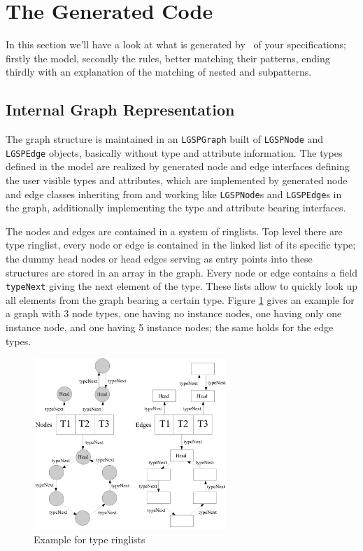 \section{The Generated Code}
In this section we'll have a look at what is generated by \GrG~of your specifications; firstly the model, secondly the rules, better matching their patterns, ending thirdly with an explanation of the matching of nested and subpatterns.

\subsection*{Internal Graph Representation}
The graph structure is maintained in an \texttt{LGSPGraph} built of \texttt{LGSPNode} and \texttt{LGSPEdge} objects, basically without type and attribute information.
The types defined in the model are realized by generated node and edge interfaces defining the user visible types and attributes, which are implemented by generated node and edge classes inheriting from and working like \texttt{LGSPNode}s and \texttt{LGSPEdge}s in the graph, additionally implementing the type and attribute bearing interfaces.

The nodes and edges are contained in a system of ringlists.
Top level there are type ringlist, every node or edge is contained in the linked list of its specific type; the dummy head nodes or head edges serving as entry points into these structures are stored in an array in the graph.
Every node or edge contains a field \texttt{typeNext} giving the next element of the type.
These lists allow to quickly look up all elements from the graph bearing a certain type.
Figure \ref{figtyperinglists} gives an example for a graph with 3 node types, one having no instance nodes, one having only one instance node, and one having 5 instance nodes; the same holds for the edge types.

\begin{figure}[htbp]
  \centering
  \includegraphics[width=0.65\textwidth]{fig/TypeRinglists}
  \caption{Example for type ringlists}
  \label{figtyperinglists}
\end{figure}

